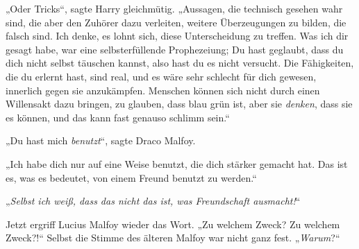 „Oder Tricks“, sagte Harry gleichmütig. „Aussagen, die technisch gesehen wahr sind, die aber den Zuhörer dazu verleiten, weitere Überzeugungen zu bilden, die falsch sind. Ich denke, es lohnt sich, diese Unterscheidung zu treffen. Was ich dir gesagt habe, war eine selbsterfüllende Prophezeiung; Du hast geglaubt, dass du dich nicht selbst täuschen kannst, also hast du es nicht versucht. Die Fähigkeiten, die du erlernt hast, sind real, und es wäre sehr schlecht für dich gewesen, innerlich gegen sie anzukämpfen. Menschen können sich nicht durch einen Willensakt dazu bringen, zu glauben, dass blau grün ist, aber sie \emph{denken}, dass sie es können, und das kann fast genauso schlimm sein.“

„Du hast mich \emph{benutzt}“, sagte Draco Malfoy.

„Ich habe dich nur auf eine Weise benutzt, die dich stärker gemacht hat. Das ist es, was es bedeutet, von einem Freund benutzt zu werden.“

„\emph{Selbst ich weiß, dass das nicht das ist, was Freundschaft ausmacht!}“

Jetzt ergriff Lucius Malfoy wieder das Wort. „Zu welchem Zweck? Zu welchem Zweck?!“ Selbst die Stimme des älteren Malfoy war nicht ganz fest. „\emph{Warum}?“


